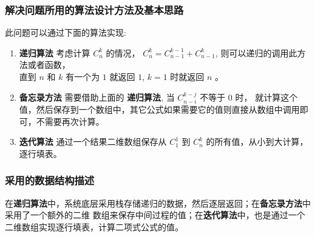 \documentclass{ctexart}
\begin{document}
\subsubsection{解决问题所用的算法设计方法及基本思路}
此问题可以通过下面的算法实现:
\begin{enumerate}
    \item {\bfseries 递归算法}
    考虑计算 $C_n^k$ 的情况， $C_n^k = C_{n-1}^{k-1} + C_{n-1}^k$, 则可以递归的调用此方法或者函数，\\
    直到 $n$ 和 $k$ 有一个为 $1$ 就返回 $1$, $k=1$ 时就返回 $n$ 。
    \item {\bfseries 备忘录方法} 需要借助上面的 {\bfseries 递归算法}, 当 $C_{n-i}^{k-j}$ 不等于 $0$ 时，
    就计算这个值，然后保存到一个数组中，其它公式如果需要它的值则直接从数组中调用即可，不需要再次计算。
    \item {\bfseries 迭代算法} 通过一个结果二维数组保存从 $C_1^1$ 到 $C_n^k$ 的所有值，从小到大计算，逐行填表。\\
\end{enumerate}
\subsubsection{采用的数据结构描述}
在{\bfseries 递归算法}中，系统底层采用栈存储递归的数据，然后逐层返回；在{\bfseries 备忘录方法}中采用了一个额外的二维
数组来保存中间过程的值；在{\bfseries 迭代算法}中，也是通过一个二维数组实现逐行填表，计算二项式公式的值。
\end{document}
